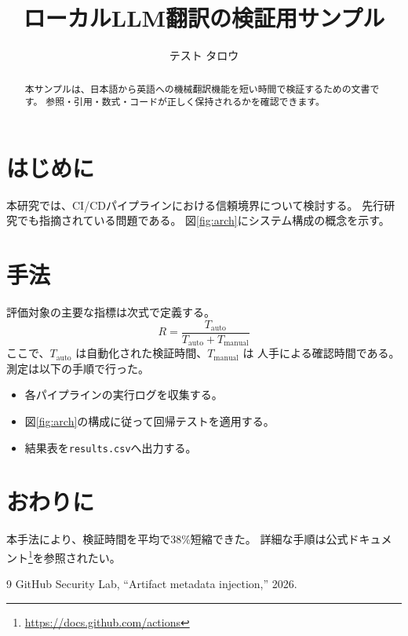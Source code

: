 \documentclass[twocolumn,ja=standard]{bxjsarticle}
\title{ローカルLLM翻訳の検証用サンプル}
\author{テスト タロウ}
\begin{document}
\maketitle

\begin{abstract}
本サンプルは、日本語から英語への機械翻訳機能を短い時間で検証するための文書です。
参照・引用・数式・コードが正しく保持されるかを確認できます。
\end{abstract}

\section{はじめに}
本研究では、CI/CDパイプラインにおける信頼境界について検討する。
先行研究\cite{ghsl2026}でも指摘されている問題である。
図\ref{fig:arch}にシステム構成の概念を示す。

\section{手法}
評価対象の主要な指標は次式で定義する。
\begin{equation}
  R = \frac{T_{\mathrm{auto}}}{T_{\mathrm{auto}} + T_{\mathrm{manual}}}
  \label{eq:ratio}
\end{equation}
ここで、$T_{\mathrm{auto}}$ は自動化された検証時間、$T_{\mathrm{manual}}$ は
人手による確認時間である。測定は以下の手順で行った。
\begin{itemize}
  \item 各パイプラインの実行ログを収集する。
  \item 図\ref{fig:arch}の構成に従って回帰テストを適用する。
  \item 結果表を\verb|results.csv|へ出力する。 %
\end{itemize}

\section{おわりに}
本手法により、検証時間を平均で38\%短縮できた。
詳細な手順は公式ドキュメント\footnote{\url{https://docs.github.com/actions}}を参照されたい。

\begin{thebibliography}{9}
 GitHub Security Lab, ``Artifact metadata injection,'' 2026.
\end{thebibliography}
\end{document}
